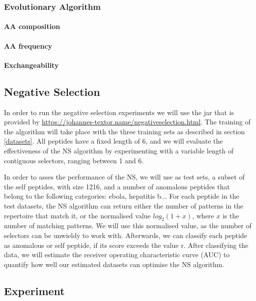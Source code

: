 \documentclass{article}
\begin{document}
\subsubsection{Evolutionary Algorithm} 

\paragraph{AA composition}

\paragraph{AA frequency}

\paragraph{Exchangeability}

\subsection{Negative Selection}
In order to run the negative selection experiments we will use the jar that is provided by \url{https://johannes-textor.name/negativeselection.html}.
The training of the algorithm will take place with the three training sets as described in section \ref{datasets}.
All peptides have a fixed length of 6, and we will evaluate the effectiveness of the NS algorithm by experimenting 
with a variable length of contiguous selectors, ranging between 1 and 6. 

In order to asses the performance of the NS, we  will use as test sets, a subset of the self peptides, with size 1216, 
and a number of anomalous peptides that belong to the following categories: ebola, hepatitis b... For each peptide in 
the test datasets, the NS algorithm can return either the number of patterns in the repertoire that match it, or the 
normalised value $log_2(1 + x)$, where $x$ is the number of matching patterns. We will use this normalised value, as the 
number of selectors can be unwieldy to work with. Afterwards, we can classify each peptide as anomalous or self peptide, 
if its score exceeds the value r. After classifying the data, we will estimate the receiver operating characteristic 
curve (AUC) to quantify how well our estimated datasets can optimise the NS algorithm.


\subsection{Experiment}
\end{document}
